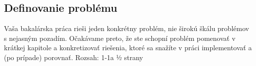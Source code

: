\subsection{Definovanie problému}
Vaša bakalárska práca rieši jeden konkrétny problém, nie širokú škálu problémov s nejasným pozadím. Očakávame preto, že ste schopní problém pomenovať v krátkej kapitole a konkretizovať riešenia, ktoré sa snažíte v práci implementovať a (po prípade) porovnať. Rozsah: 1-1a ½ strany
\cite{key}